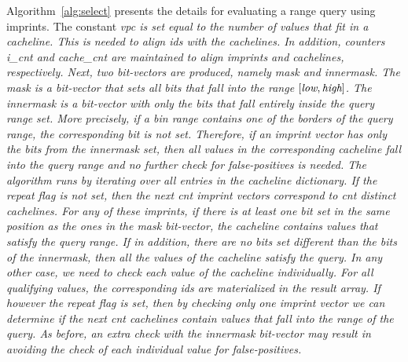 Algorithm~\ref{alg:select} presents the details for evaluating a range query
using imprints. The constant \it{vpc} is set equal to the number of values that
fit in a cacheline. This is needed to align \it{id}s with the cachelines. In
addition, counters \it{i\_cnt} and \it{cache\_cnt} are maintained to align
imprints and cachelines, respectively. Next, two bit-vectors are produced,
namely \it{mask} and \it{innermask}. The \it{mask} is a bit-vector that sets
all bits that fall into the range $[\it{low},\it{high}]$. The \it{innermask} is
a bit-vector with only the bits that fall entirely inside the query range set.
More precisely, if a bin range contains one of the borders of the query range,
the corresponding bit is not set. Therefore, if an imprint vector
has only the bits from the \it{innermask} set, then all values in the
corresponding cacheline fall into the query range and no further check for
false-positives is needed. The algorithm runs by iterating over all
entries in the cacheline dictionary. If the \it{repeat} flag is not set, then
the next \it{cnt} imprint vectors correspond to \it{cnt} distinct cachelines.
For any of these imprints, if there is at least one bit set in the same
position as the ones in the \it{mask} bit-vector, the cacheline contains
values that satisfy the query range. If in addition, there are no bits set
different than the bits of the \it{innermask}, then all the values of the
cacheline satisfy the query. In any other case, we need to check each value
of the cacheline individually. For all qualifying values, the corresponding
\it{id}s are materialized in the result array. If however the \it{repeat} flag
is set, then by checking only one imprint vector we can determine if the next
\it{cnt} cachelines contain values that fall into the range of the query. As
before, an extra check with the \it{innermask} bit-vector may result in
avoiding the check of each individual value for false-positives.

